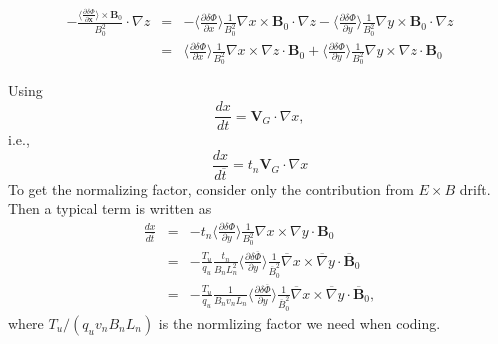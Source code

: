 \documentclass{llncs}
\begin{document}
\begin{eqnarray}
  - \frac{\langle \frac{\partial \delta \Phi}{\partial \mathbf{x}} \rangle
  \times \mathbf{B}_0}{B_0^2} \cdot \nabla z & = & - \langle \frac{\partial
  \delta \Phi}{\partial x} \rangle \frac{1}{B_0^2} \nabla x \times
  \mathbf{B}_0 \cdot \nabla z - \langle \frac{\partial \delta \Phi}{\partial
  y} \rangle \frac{1}{B_0^2} \nabla y \times \mathbf{B}_0 \cdot \nabla z
  \nonumber\\
  & = & \langle \frac{\partial \delta \Phi}{\partial x} \rangle
  \frac{1}{B_0^2} \nabla x \times \nabla z \cdot \mathbf{B}_0 + \langle
  \frac{\partial \delta \Phi}{\partial y} \rangle \frac{1}{B_0^2} \nabla y
  \times \nabla z \cdot \mathbf{B}_0 
\end{eqnarray}


Using
\begin{equation}
  \frac{d x}{d t} =\mathbf{V}_G \cdot \nabla x,
\end{equation}
i.e.,
\begin{equation}
  \frac{d x}{d \overline{t}} = t_n \mathbf{V}_G \cdot \nabla x
\end{equation}
To get the normalizing factor, consider only the contribution from $E \times
B$ drift. Then a typical term is written as
\begin{eqnarray}
  \frac{d x}{d \overline{t}} & = & - t_n \langle \frac{\partial \delta
  \Phi}{\partial y} \rangle \frac{1}{B_0^2} \nabla x \times \nabla y \cdot
  \mathbf{B}_0 \nonumber\\
  & = & - \frac{T_u}{q_u} \frac{t_n}{B_n L_n^2} \langle \frac{\partial \delta
  \overline{\Phi}}{\partial y} \rangle \frac{1}{\overline{B}_0^2}
  \overline{\nabla} x \times \overline{\nabla} y \cdot \overline{\mathbf{B}}_0
  \nonumber\\
  & = & - \frac{T_u}{q_u} \frac{1}{B_n v_n L_n} \langle \frac{\partial \delta
  \overline{\Phi}}{\partial y} \rangle \frac{1}{\overline{B}_0^2}
  \overline{\nabla} x \times \overline{\nabla} y \cdot
  \overline{\mathbf{B}}_0, 
\end{eqnarray}
where $T_u / (q_u v_n B_n L_n)$ is the normlizing factor we need when coding.
\end{document}
